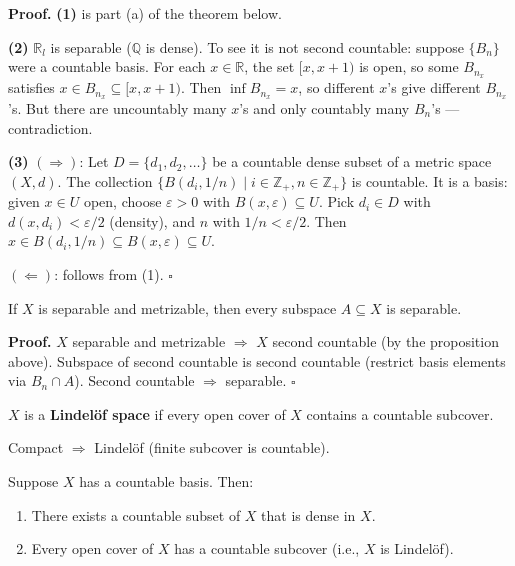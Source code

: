 \documentclass[11pt]{report}
\renewenvironment{proof}[1][Proof]{\noindent\textbf{#1.} }{\hfill$\square$\par\vspace{5pt}}
\begin{document}
\begin{proof}
\textbf{(1)} is part (a) of the theorem below.

\textbf{(2)} $\mathbb{R}_l$ is separable ($\mathbb{Q}$ is dense). To see it is not second countable: suppose $\{B_n\}$ were a countable basis. For each $x \in \mathbb{R}$, the set $[x, x+1)$ is open, so some $B_{n_x}$ satisfies $x \in B_{n_x} \subseteq [x, x+1)$. Then $\inf B_{n_x} = x$, so different $x$'s give different $B_{n_x}$'s. But there are uncountably many $x$'s and only countably many $B_n$'s --- contradiction.

\textbf{(3)} $(\Rightarrow)$: Let $D = \{d_1, d_2, \ldots\}$ be a countable dense subset of a metric space $(X, d)$. The collection $\{B(d_i, 1/n) \mid i \in \mathbb{Z}_+, n \in \mathbb{Z}_+\}$ is countable. It is a basis: given $x \in U$ open, choose $\varepsilon > 0$ with $B(x, \varepsilon) \subseteq U$. Pick $d_i \in D$ with $d(x, d_i) < \varepsilon/2$ (density), and $n$ with $1/n < \varepsilon/2$. Then $x \in B(d_i, 1/n) \subseteq B(x, \varepsilon) \subseteq U$.

$(\Leftarrow)$: follows from (1).
\end{proof}

\begin{propbox}
If $X$ is separable and metrizable, then every subspace $A \subseteq X$ is separable.
\end{propbox}

\begin{proof}
$X$ separable and metrizable $\Rightarrow$ $X$ second countable (by the proposition above). Subspace of second countable is second countable (restrict basis elements via $B_n \cap A$). Second countable $\Rightarrow$ separable.
\end{proof}

\begin{defbox}
$X$ is a \textbf{Lindelöf space} if every open cover of $X$ contains a countable subcover.
\end{defbox}

\begin{rembox}
Compact $\Rightarrow$ Lindelöf (finite subcover is countable).
\end{rembox}

\begin{thmbox}
Suppose $X$ has a countable basis. Then:
\begin{enumerate}
    \item[(a)] There exists a countable subset of $X$ that is dense in $X$.
    \item[(b)] Every open cover of $X$ has a countable subcover (i.e., $X$ is Lindelöf).
\end{enumerate}
\end{thmbox}
\end{document}
